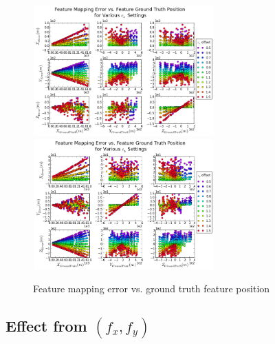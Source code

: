 \begin{figure}[h]
  \centering
  \includegraphics[width=7cm, height=5cm]{./Figures/SimulationFigures/Figure32.png}
  \includegraphics[width=7cm, height=5cm]{./Figures/SimulationFigures/Figure33.png}
  \caption{Feature mapping error vs. ground truth feature position}
  \label{fig:simfig32-33}
\end{figure}
\FloatBarrier

\subsection{Effect from $(f_x, f_y)$}

